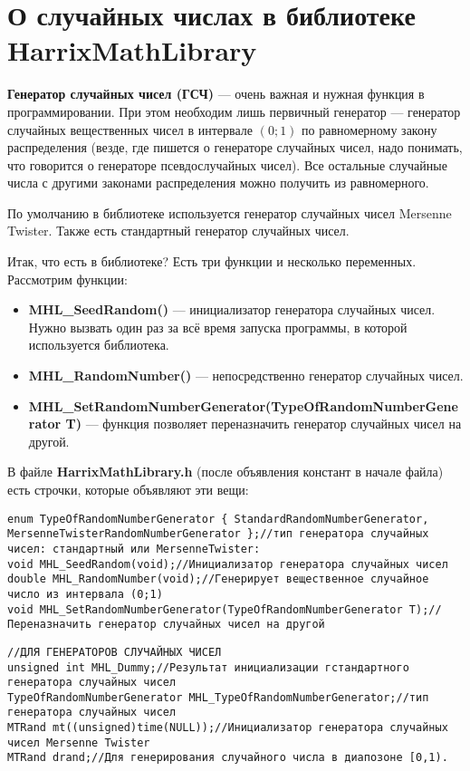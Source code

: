 \newpage
\section{О случайных числах в библиотеке HarrixMathLibrary}\label{section_random}

\textbf{Генератор случайных чисел (ГСЧ)} --- очень важная и нужная функция в программировании. При этом необходим лишь первичный генератор --- генератор случайных вещественных чисел в интервале $\left( 0; 1\right)$ по равномерному закону распределения (везде, где пишется о генераторе случайных чисел, надо понимать, что говорится о генераторе псевдослучайных чисел). Все остальные случайные числа с другими законами распределения можно получить из равномерного.

По умолчанию в библиотеке используется генератор случайных чисел Mersenne Twister. Также есть стандартный генератор случайных чисел.


Итак, что есть в библиотеке? Есть три функции и несколько переменных. Рассмотрим функции:
\begin{itemize}
\item \textbf{MHL\_SeedRandom()} --- инициализатор генератора случайных чисел. Нужно вызвать один раз за всё время запуска программы, в которой используется библиотека.
\item \textbf{MHL\_RandomNumber()} --- непосредственно генератор случайных чисел.
\item \textbf{MHL\_SetRandomNumberGenerator(TypeOfRandomNumberGenerator T)} --- функция позволяет переназначить генератор случайных чисел на другой.
\end{itemize}

В файле \textbf{HarrixMathLibrary.h} (после объявления констант в начале файла) есть строчки, которые объявляют эти вещи:
\begin{lstlisting}[label=random_h,caption=Объявление функций в HarrixMathLibrary.h]
enum TypeOfRandomNumberGenerator { StandardRandomNumberGenerator, MersenneTwisterRandomNumberGenerator };//тип генератора случайных чисел: стандартный или MersenneTwister:
void MHL_SeedRandom(void);//Инициализатор генератора случайных чисел
double MHL_RandomNumber(void);//Генерирует вещественное случайное число из интервала (0;1)
void MHL_SetRandomNumberGenerator(TypeOfRandomNumberGenerator T);//Переназначить генератор случайных чисел на другой
\end{lstlisting}

\begin{lstlisting}[label=random_h_cpp,caption=Объявление переменной в HarrixMathLibrary.cpp]
//ДЛЯ ГЕНЕРАТОРОВ СЛУЧАЙНЫХ ЧИСЕЛ
unsigned int MHL_Dummy;//Результат инициализации гстандартного генератора случайных чисел
TypeOfRandomNumberGenerator MHL_TypeOfRandomNumberGenerator;//тип генератора случайных чисел
MTRand mt((unsigned)time(NULL));//Инициализатор генератора случайных чисел Mersenne Twister
MTRand drand;//Для генерирования случайного числа в диапозоне [0,1).
\end{lstlisting}

